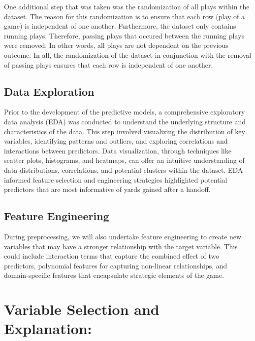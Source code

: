 \documentclass[
  super,
  preprint,
  3p]{elsarticle}
\begin{document}
One additional step that was taken was the randomization of all plays
within the dataset. The reason for this randomization is to ensure that
each row (play of a game) is independent of one another. Furthermore,
the dataset only contains running plays. Therefore, passing plays that
occured between the running plays were removed. In other words, all
plays are not dependent on the previous outcome. In all, the
randomization of the dataset in conjunction with the removal of passing
plays ensures that each row is independent of one another.

\hypertarget{data-exploration}{%
\subsection{Data Exploration}\label{data-exploration}}

Prior to the development of the predictive models, a comprehensive
exploratory data analysis (EDA) was conducted to understand the
underlying structure and characteristics of the data. This step involved
visualizing the distribution of key variables, identifying patterns and
outliers, and exploring correlations and interactions between
predictors. Data visualization, through techniques like scatter plots,
histograms, and heatmaps, can offer an intuitive understanding of data
distributions, correlations, and potential clusters within the dataset.
EDA-informed feature selection and engineering strategies highlighted
potential predictors that are most informative of yards gained after a
handoff.

\hypertarget{feature-engineering}{%
\subsection{Feature Engineering}\label{feature-engineering}}

During preprocessing, we will also undertake feature engineering to
create new variables that may have a stronger relationship with the
target variable. This could include interaction terms that capture the
combined effect of two predictors, polynomial features for capturing
non-linear relationships, and domain-specific features that encapsulate
strategic elements of the game.

\hypertarget{variable-selection-and-explanation}{%
\section{Variable Selection and
Explanation:}\label{variable-selection-and-explanation}}
\end{document}
